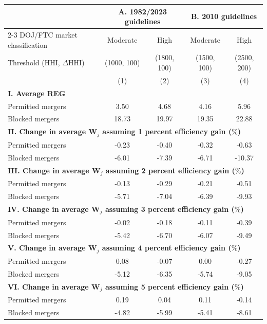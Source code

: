 \begin{tabular}{l @{\hspace{1em}} cc @{\hspace{3em}} cc}
\toprule
 & \multicolumn{2}{c}{\textbf{A. 1982/2023 guidelines}} & \multicolumn{2}{c}{\textbf{B. 2010 guidelines}} \\ 
\cmidrule{2-3}
\cmidrule{4-5}
DOJ/FTC market classification & Moderate & High & Moderate & High \\ 
Threshold (HHI, $\Delta$HHI) & (1000,  100) & (1800, 100) & (1500, 100) & (2500, 200) \\ 
 & (1) & (2) & (3) & (4) \\ 
\midrule
\multicolumn{5}{l}{\textbf{I. Average REG}} \\ 
Permitted mergers & 3.50 & 4.68 & 4.16 & 5.96  \\ 
Blocked mergers & 18.73 & 19.97 & 19.35 & 22.88  \\ 
\midrule
\multicolumn{5}{l}{\textbf{II. Change in average $\mathbf{W}_j$ assuming 1 percent efficiency gain ($\%$)}} \\ 
Permitted mergers & -0.23 & -0.40 & -0.32 & -0.63\\ 
Blocked mergers & -6.01 & -7.39 & -6.71 & -10.37\\ 
\midrule
\multicolumn{5}{l}{\textbf{III. Change in average $\mathbf{W}_j$ assuming 2 percent efficiency gain ($\%$)}} \\ 
Permitted mergers & -0.13 & -0.29 & -0.21 & -0.51 \\ 
Blocked mergers & -5.71 & -7.04 & -6.39 & -9.93 \\ 
\midrule
\multicolumn{5}{l}{\textbf{IV. Change in average $\mathbf{W}_j$ assuming 3 percent efficiency gain ($\%$)}} \\ 
Permitted mergers & -0.02 & -0.18 & -0.11 & -0.39 \\ 
Blocked mergers & -5.42 & -6.70 & -6.07 & -9.49 \\ 
\midrule
\multicolumn{5}{l}{\textbf{V. Change in average $\mathbf{W}_j$ assuming 4 percent efficiency gain ($\%$)}} \\ 
Permitted mergers & 0.08 & -0.07 & 0.00 & -0.27 \\ 
Blocked mergers & -5.12 & -6.35 & -5.74 & -9.05 \\ 
\midrule
\multicolumn{5}{l}{\textbf{VI. Change in average $\mathbf{W}_j$ assuming 5 percent efficiency gain ($\%$)}} \\ 
Permitted mergers & 0.19 & 0.04 & 0.11 & -0.14 \\ 
Blocked mergers & -4.82 & -5.99 & -5.41 & -8.61 \\ 
\bottomrule 
\end{tabular}